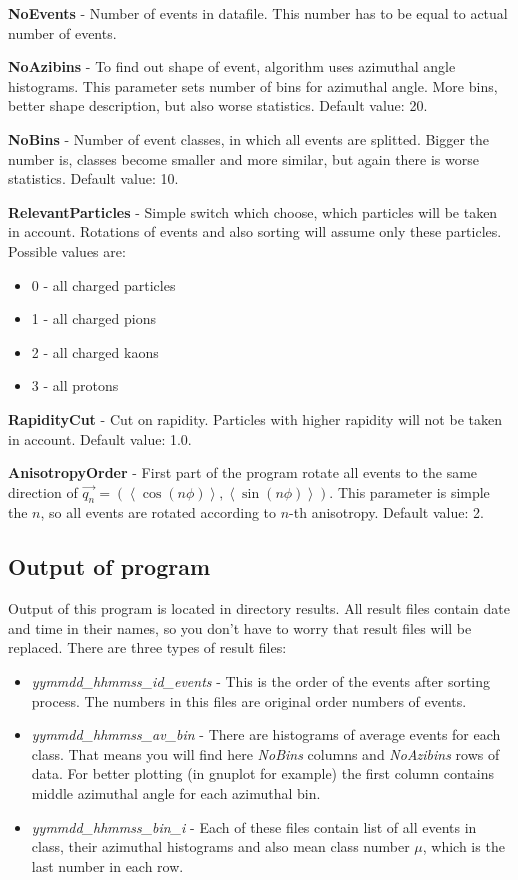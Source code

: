 \documentclass[a4paper]{article}
\begin{document}
\textbf{NoEvents} - Number of events in datafile. This number has to be equal to actual number of events.

\textbf{NoAzibins} - To find out shape of event, algorithm uses azimuthal angle histograms. This parameter sets number of bins for azimuthal angle. More bins, better shape description, but also worse statistics. Default value: 20.

\textbf{NoBins} - Number of event classes, in which all events are splitted. Bigger the number is, classes become smaller and more similar, but again there is worse statistics. Default value: 10.

\textbf{RelevantParticles} - Simple switch which choose, which particles will be taken in account. Rotations of events and also sorting will assume only these particles. Possible values are:
\begin{itemize}
\item 0 - all charged particles
\item 1 - all charged pions
\item 2 - all charged kaons
\item 3 - all protons
\end{itemize}

\textbf{RapidityCut} - Cut on rapidity. Particles with higher rapidity will not be taken in account. Default value: 1.0.

\textbf{AnisotropyOrder} - First part of the program rotate all events to the same direction of ${\vec{q_n}=\left(\left\langle \cos(n\phi)\right\rangle ,\left\langle \sin(n\phi)\right\rangle \right) }$. This parameter is simple the $n$, so all events are rotated according to $n$-th anisotropy. Default value: 2.

\subsection*{Output of program}

Output of this program is located in directory results. All result files contain date and time in their names, so you don't have to worry that result files will be replaced. There are three types of result files:
\begin{itemize}
\item \textit{yymmdd\_hhmmss\_id\_events} - This is the order of the events after sorting process. The numbers in this files are original order numbers of events.
\item \textit{yymmdd\_hhmmss\_av\_bin} - There are histograms of average events for each class. That means you will find here \textit{NoBins} columns and \textit{NoAzibins} rows of data. For better plotting (in gnuplot for example) the first column contains middle azimuthal angle for each azimuthal bin.
\item \textit{yymmdd\_hhmmss\_bin\_i} - Each of these files contain list of all events in class, their azimuthal histograms and also mean class number $\mu$, which is the last number in each row.
\end{itemize}
\end{document}
